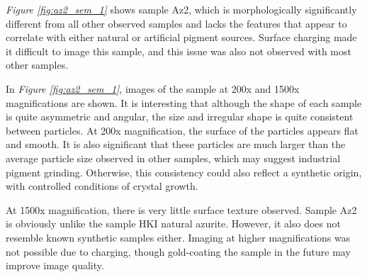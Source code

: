 \textit{Figure \ref{fig:az2_sem_1}} shows sample Az2, which is morphologically significantly different from all other observed samples and lacks the features that appear to correlate with either natural or artificial pigment sources. Surface charging made it difficult to image this sample, and this issue was also not observed with most other samples.

In \textit{Figure \ref{fig:az2_sem_1}}, images of the sample at 200x and 1500x magnifications are shown. It is interesting that although the shape of each sample is quite asymmetric and angular, the size and irregular shape is quite consistent between particles. At 200x magnification, the surface of the particles appears flat and smooth. It is also significant that these particles are much larger than the average particle size observed in other samples, which may suggest industrial pigment grinding. Otherwise, this consistency could also reflect a synthetic origin, with controlled conditions of crystal growth.

At 1500x magnification, there is very little surface texture observed. Sample Az2 is obviously unlike the sample HKI natural azurite. However, it also does not resemble known synthetic samples either. Imaging at higher magnifications was not possible due to charging, though gold-coating the sample in the future may improve image quality.

